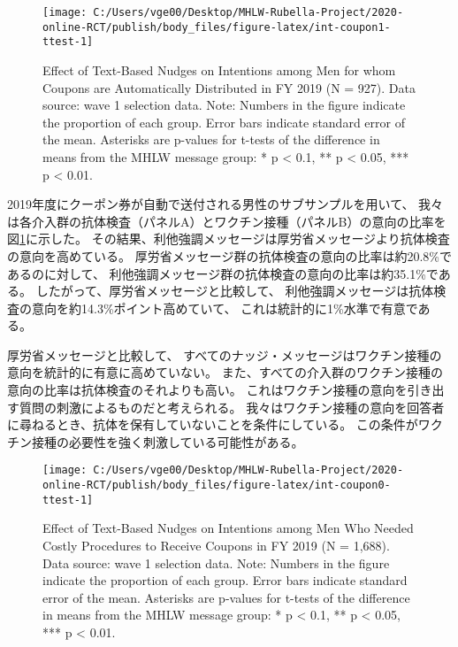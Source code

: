 \documentclass[
  11pt,
  a4paper,
]{article}
\begin{document}
\begin{figure}[t]
\texttt{[image: C:/Users/vge00/Desktop/MHLW-Rubella-Project/2020-online-RCT/publish/body\_files/figure-latex/int-coupon1-ttest-1]} \caption{Effect of Text-Based Nudges on Intentions among Men for whom Coupons are Automatically Distributed in FY 2019 (N = 927). Data source: wave 1 selection data. Note: Numbers in the figure indicate the proportion of each group. Error bars indicate standard error of the mean. Asterisks are p-values for t-tests of the difference in means from the MHLW message group: * p < 0.1, ** p < 0.05, *** p < 0.01.}\label{fig:int-coupon1-ttest}
\end{figure}

2019年度にクーポン券が自動で送付される男性のサブサンプルを用いて、
我々は各介入群の抗体検査（パネルA）とワクチン接種（パネルB）の意向の比率を
図\ref{fig:int-coupon1-ttest}に示した。
その結果、利他強調メッセージは厚労省メッセージより抗体検査の意向を高めている。
厚労省メッセージ群の抗体検査の意向の比率は約20.8\%であるのに対して、
利他強調メッセージ群の抗体検査の意向の比率は約35.1\%である。
したがって、厚労省メッセージと比較して、
利他強調メッセージは抗体検査の意向を約14.3\%ポイント高めていて、
これは統計的に1\%水準で有意である。

厚労省メッセージと比較して、
すべてのナッジ・メッセージはワクチン接種の意向を統計的に有意に高めていない。
また、すべての介入群のワクチン接種の意向の比率は抗体検査のそれよりも高い。
これはワクチン接種の意向を引き出す質問の刺激によるものだと考えられる。
我々はワクチン接種の意向を回答者に尋ねるとき、抗体を保有していないことを条件にしている。
この条件がワクチン接種の必要性を強く刺激している可能性がある。

\begin{figure}[t]
\texttt{[image: C:/Users/vge00/Desktop/MHLW-Rubella-Project/2020-online-RCT/publish/body\_files/figure-latex/int-coupon0-ttest-1]} \caption{Effect of Text-Based Nudges on Intentions among Men Who Needed Costly Procedures to Receive Coupons in FY 2019 (N = 1,688). Data source: wave 1 selection data. Note: Numbers in the figure indicate the proportion of each group. Error bars indicate standard error of the mean. Asterisks are p-values for t-tests of the difference in means from the MHLW message group: * p < 0.1, ** p < 0.05, *** p < 0.01.}\label{fig:int-coupon0-ttest}
\end{figure}
\end{document}
